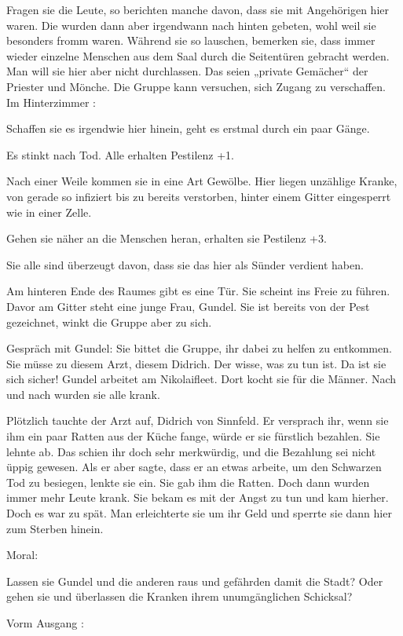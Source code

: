 Fragen sie die Leute, so berichten manche davon, dass sie mit Angehörigen hier waren.
Die wurden dann aber irgendwann nach hinten gebeten, wohl weil sie besonders fromm waren. Während sie so lauschen, bemerken sie, dass immer wieder einzelne Menschen aus dem Saal durch die Seitentüren gebracht werden.
Man will sie hier aber nicht durchlassen. Das seien „private Gemächer“ der Priester und Mönche. Die Gruppe kann versuchen, sich Zugang zu verschaffen.
Im Hinterzimmer
:

Schaffen sie es irgendwie hier hinein, geht es erstmal durch ein paar Gänge.

Es stinkt nach Tod. Alle erhalten Pestilenz +1.

Nach einer Weile kommen sie in eine Art Gewölbe. Hier liegen unzählige Kranke, von gerade so infiziert bis zu bereits verstorben, hinter einem Gitter eingesperrt wie in einer Zelle.

Gehen sie näher an die Menschen heran, erhalten sie Pestilenz +3.

Sie alle sind überzeugt davon, dass sie das hier als Sünder verdient haben.

Am hinteren Ende des Raumes gibt es eine Tür. Sie scheint ins Freie zu führen. Davor am Gitter steht eine junge Frau, Gundel. Sie ist bereits von der Pest gezeichnet, winkt die Gruppe aber zu sich.

Gespräch mit Gundel: Sie bittet die Gruppe, ihr dabei zu helfen zu entkommen. Sie müsse zu diesem Arzt, diesem Didrich. Der wisse, was zu tun ist. Da ist sie sich sicher! Gundel arbeitet am Nikolaifleet. Dort kocht sie für die Männer. Nach und nach wurden sie alle krank.

Plötzlich tauchte der Arzt auf, Didrich von Sinnfeld. Er versprach ihr, wenn sie ihm ein paar Ratten aus der Küche fange, würde er sie fürstlich bezahlen. Sie lehnte ab. Das schien ihr doch sehr merkwürdig, und die Bezahlung sei nicht üppig gewesen. Als er aber sagte, dass er an etwas arbeite, um den Schwarzen Tod zu besiegen, lenkte sie ein. Sie gab ihm die Ratten. Doch dann wurden immer mehr Leute krank. Sie bekam es mit der Angst zu tun und kam hierher. Doch es war zu spät. Man erleichterte sie um ihr Geld und sperrte sie dann hier zum Sterben hinein.


Moral:

Lassen sie Gundel und die anderen raus und gefährden damit die Stadt? Oder gehen sie und überlassen die Kranken ihrem unumgänglichen Schicksal?

Vorm Ausgang
:

